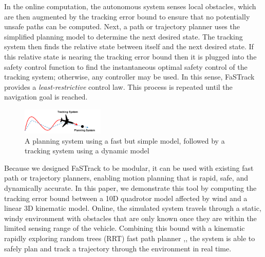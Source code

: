 In the online computation, the autonomous system senses local obstacles, which are then augmented by the tracking error bound to ensure that no potentially unsafe paths can be computed. Next, a path or trajectory planner uses the simplified planning model to determine the next desired state. The tracking system then finds the relative state between itself and the next desired state. If this relative state is nearing the tracking error bound then it is plugged into the safety control function to find the instantaneous optimal safety control of the tracking system; otherwise, any controller may be used. In this sense, FaSTrack provides a \emph{least-restrictive} control law. This process is repeated until the navigation goal is reached. 
  

\begin{figure}
	\centering
	\includegraphics[width=0.35\textwidth]{fig/chasing}
	\caption{A planning system using a fast but simple model, followed by a tracking system using a dynamic model}
	\label{fig:chasing}
	\vspace{-.23in}
\end{figure}
%
Because we designed FaSTrack to be modular, it can be used with existing fast path or trajectory planners, enabling motion planning that is rapid, safe, and dynamically accurate. In this paper, we demonstrate this tool by computing the tracking error bound between a 10D quadrotor model affected by wind and a linear 3D kinematic model. Online, the simulated system travels through a static, windy environment with obstacles that are only known once they are within the limited sensing range of the vehicle. Combining this bound with a kinematic rapidly exploring random trees (RRT) fast path planner \cite{Kuffner2000},\cite{Kavraki1996}, the system is able to safely plan and track a trajectory through the environment in real time.